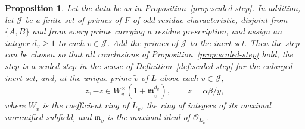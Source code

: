 \documentclass[11pt]{article}
\theoremstyle{plain}
\newtheorem{proposition}[theorem]{Proposition}
\theoremstyle{definition}
\theoremstyle{remark}
\newcommand{\OO}{\mathcal O}
\begin{document}
\begin{proposition}\label{prop:finite-precision}
Let the data be as in Proposition~\ref{prop:scaled-step}.  In addition,
let $\mathcal J$ be a finite set of primes of $F$ of odd residue
characteristic, disjoint from $\{A,B\}$ and from every prime carrying a
residue prescription, and assign an integer $d_v\ge1$ to each
$v\in\mathcal J$.  Add the primes of $\mathcal J$ to the inert set.  Then
the step can be chosen so that all conclusions of
Proposition~\ref{prop:scaled-step} hold, the step is a scaled step in the
sense of Definition~\ref{def:scaled-step} for the enlarged inert set, and,
at the unique prime $\widetilde v$ of $L$ above each $v\in\mathcal J$,
\begin{equation}\label{eq:finite-coefficient-precision}
 z,-z\in W_{\widetilde v}^\times
              (1+\mathfrak m_{\widetilde v}^{d_v}),
 \qquad z=\alpha\beta/y,
\end{equation}
where $W_{\widetilde v}$ is the coefficient ring of $L_{\widetilde v}$,
the ring of integers of its maximal unramified subfield, and
$\mathfrak m_{\widetilde v}$ is the maximal ideal of
$\OO_{L_{\widetilde v}}$.
\end{proposition}
\end{document}
